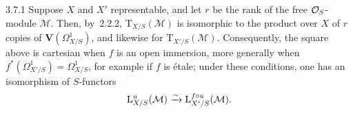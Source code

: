 \begin{remark}{3.7.1}
\label{II.3.7.1}
{\renewcommand{\thefootnote}{(27)}}
Suppose \(X\) and \(X'\) representable, and let \(r\) be the rank of the free
\(\mathcal{O}_S\)-module \(\mathcal{M}\). Then, by~2.2.2,
\(\mathrm{T}_{X/S}(\mathcal{M})\) is isomorphic to the product over \(X\) of
\(r\) copies of \(\mathbf{V}(\Omega^1_{X/S})\), and likewise for
\(\mathrm{T}_{X'/S}(\mathcal{M})\). Consequently, the square above is
cartesian when \(f\) is an open immersion, more generally when
\(f^*(\Omega^1_{X'/S})=\Omega^1_{X/S}\), for example if \(f\) is \'etale;
under these conditions, one has an isomorphism of \(S\)-functors
\[
\mathrm{L}^{u}_{X/S}(\mathcal{M})
\xrightarrow{\sim}
\mathrm{L}^{f\circ u}_{X'/S}(\mathcal{M}).
\]
\end{remark}
